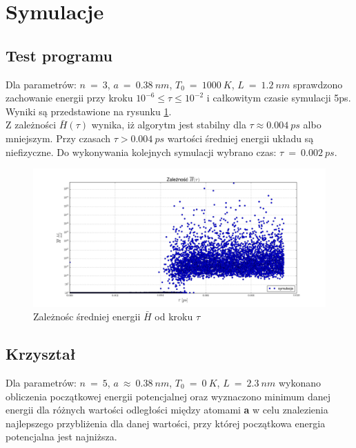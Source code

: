 \documentclass[10]{article}
\begin{document}
\vspace{2cm}
\section{Symulacje}

\subsection{Test programu}
Dla parametrów: $n~=~3$, $a~=~0.38~ nm$, $T_0 ~=~1000~ K$, $L~=~1.2~nm$ sprawdzono zachowanie energii przy kroku $ 10^{-6}\leq \tau \leq 10^{-2}$ i całkowitym czasie symulacji 5ps. Wyniki są przedstawione na rysunku \ref{wykres:(H_av)tau)}. \\
Z zależności $\bar{H}(\tau)$ wynika, iż algorytm jest stabilny dla $\tau \approx 0.004 ~ps$ albo mniejszym. Przy czasach $\tau > 0.004~ps$ wartości średniej energii układu są niefizyczne. Do wykonywania kolejnych symulacji wybrano czas: $\tau~=~0.002~ps$.

\begin{figure}[H]
\begin{center}
\includegraphics[width=1.\textwidth]{zaleznosc_Hav_od_tau.png}
\caption{Zależnośc średniej energii $\bar{H}$ od kroku $\tau$} \label{wykres:(H_av)tau)}
\end{center}
\end{figure}

\subsection{Krzyształ}
Dla parametrów: $n~=~5$, $a~\approx~0.38~ nm$, $T_0 ~=~0~ K$, $L~=~2.3~nm$ wykonano obliczenia początkowej energii potencjalnej oraz wyznaczono minimum danej energii dla różnych wartości odległości między atomami \textbf{a} w celu znalezienia najlepszego przybliżenia dla danej wartości, przy której początkowa energia potencjalna jest najniższa.
\end{document}
